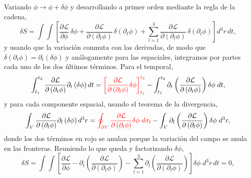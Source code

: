         Variando $\phi\rightarrow\phi+\delta\phi$ y desarrollando a primer orden mediante la regla de la cadena,
        \begin{equation}\label{eq:VariacionCampo}
            \delta S = \int\!\!\int\left[\frac{\partial\mathcal{L}}{\partial\phi}\,\delta\phi
            + \frac{\partial\mathcal{L}}{\partial\left(\partial_{t}\phi\right)}\,\delta\left(\partial_{t}\phi\right)
            + \sum_{l=1}^{3}\frac{\partial\mathcal{L}}{\partial\left(\partial_{l}\phi\right)}\,\delta\left(\partial_{l}\phi\right)\right]d^{3}r\,dt,
        \end{equation}
        y usando que la variación conmuta con las derivadas, de modo que $\delta(\partial_{t}\phi) = \partial_{t}(\delta\phi)$ y análogamente para las espaciales, integramos por partes cada uno de los dos últimos términos. Para el temporal,
        \begin{equation}\label{eq:PartesTemporal}
            \int_{t_{1}}^{t_{2}}\frac{\partial\mathcal{L}}{\partial\left(\partial_{t}\phi\right)}\partial_{t}\left(\delta\phi\right)dt
            = \textcolor{red}{\left[\frac{\partial\mathcal{L}}{\partial\left(\partial_{t}\phi\right)}\delta\phi\right]_{t_{1}}^{t_{2}}}
            - \int_{t_{1}}^{t_{2}}\partial_{t}\left(\frac{\partial\mathcal{L}}{\partial\left(\partial_{t}\phi\right)}\right)\delta\phi\;dt,
        \end{equation}
        y para cada componente espacial, usando el teorema de la divergencia,
        \begin{equation}\label{eq:PartesEspacial}
            \int_{V}\frac{\partial\mathcal{L}}{\partial\left(\partial_{l}\phi\right)}\partial_{l}\left(\delta\phi\right)d^{3}r
            = \textcolor{red}{\oint_{\partial V}\frac{\partial\mathcal{L}}{\partial\left(\partial_{l}\phi\right)}\delta\phi\;d\sigma_{l}}
            - \int_{V}\partial_{l}\left(\frac{\partial\mathcal{L}}{\partial\left(\partial_{l}\phi\right)}\right)\delta\phi\;d^{3}r,
        \end{equation}
        donde los dos términos en rojo se anulan porque la variación del campo se anula en las fronteras. Reuniendo lo que queda y factorizando $\delta\phi$,
        \begin{equation}\label{eq:VariacionCampoFinal}
            \delta S = \int\!\!\int\left[\frac{\partial\mathcal{L}}{\partial\phi}
            - \partial_{t}\left(\frac{\partial\mathcal{L}}{\partial\left(\partial_{t}\phi\right)}\right)
            - \sum_{l=1}^{3}\partial_{l}\left(\frac{\partial\mathcal{L}}{\partial\left(\partial_{l}\phi\right)}\right)\right]\delta\phi\;d^{3}r\,dt = 0,
        \end{equation}
